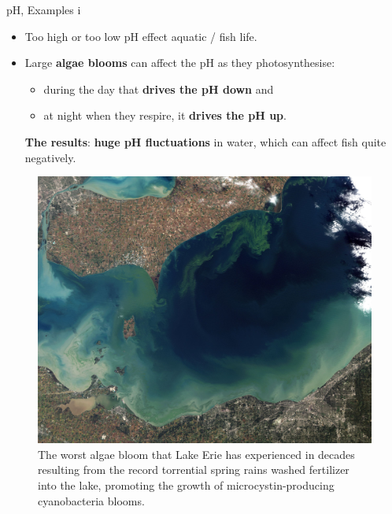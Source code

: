 \begin{frame}{pH, Examples \; i}
	
	\lcol
	\vskip -5pt
	\begin{itemize}
		\item Too high or too low pH effect aquatic / fish life. 
		\pause
		\item 
	Large \alert{\textbf{algae blooms}} can affect the pH as they photosynthesise: 
	\begin{itemize}
		\item during the day that \textbf{drives the pH down} and 
		\item at night when they respire, it \textbf{drives the pH up}.
	\end{itemize}
	\alert{\textbf{The results}}: \textbf{huge pH fluctuations} in water, which can affect fish quite negatively. 
	\end{itemize}
	\rcol
	\begin{figure}
		\centering
		\includegraphics[width=0.85\columnwidth]{figures/chemical-equilibrium/toxic_algae_bloom_lake_erie.jpg}
		\caption{\small The worst algae bloom that Lake Erie has experienced in decades resulting from the record torrential spring rains washed fertilizer into the lake, promoting the growth of microcystin-producing cyanobacteria blooms.}
	\end{figure}

	\ecol
	
\end{frame}
%
